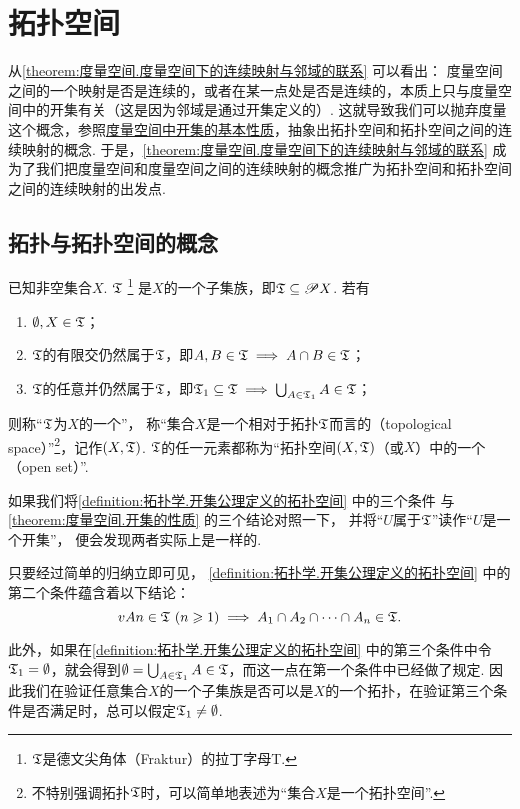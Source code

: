 \section{拓扑空间}
从\cref{theorem:度量空间.度量空间下的连续映射与邻域的联系} 可以看出：
度量空间之间的一个映射是否是连续的，或者在某一点处是否是连续的，本质上只与度量空间中的开集有关（这是因为邻域是通过开集定义的）.
这就导致我们可以抛弃度量这个概念，参照\hyperref[theorem:度量空间.开集的性质]{度量空间中开集的基本性质}，抽象出拓扑空间和拓扑空间之间的连续映射的概念.
于是，\cref{theorem:度量空间.度量空间下的连续映射与邻域的联系} 成为了我们把度量空间和度量空间之间的连续映射的概念推广为拓扑空间和拓扑空间之间的连续映射的出发点.

\subsection{拓扑与拓扑空间的概念}
\begin{definition}\label{definition:拓扑学.开集公理定义的拓扑空间}
已知非空集合\(X\).
\(\mathfrak T\)
\footnote{\(\mathfrak T\)是德文尖角体（Fraktur）的拉丁字母T.}
是\(X\)的一个子集族，即\(\mathfrak T \subseteq \mathscr{P} X\).
若有
\begin{enumerate}
\item \(\emptyset,X \in \mathfrak T\)；
\item \(\mathfrak T\)的有限交仍然属于\(\mathfrak T\)，即\(A,B \in \mathfrak T \implies A \cap B \in \mathfrak T\)；
\item \(\mathfrak T\)的任意并仍然属于\(\mathfrak T\)，即\(\mathfrak T_1 \subseteq \mathfrak T \implies \bigcup_{A \in \mathfrak T_1} A \in \mathfrak T\)；
\end{enumerate}
则称“\(\mathfrak T\)为\(X\)的一个”，%
称“集合\(X\)是一个相对于拓扑\(\mathfrak T\)而言的（topological space）”\footnote{%
不特别强调拓扑\(\mathfrak T\)时，可以简单地表述为“集合\(X\)是一个拓扑空间”.%
}，记作\((X,\mathfrak T)\).
\(\mathfrak T\)的任一元素都称为“拓扑空间\((X,\mathfrak T)\)（或\(X\)）中的一个（open set）”.
\end{definition}
如果我们将\cref{definition:拓扑学.开集公理定义的拓扑空间} 中的三个条件
与\cref{theorem:度量空间.开集的性质} 的三个结论对照一下，
并将“\(U\)属于\(\mathfrak T\)”读作“\(U\)是一个开集”，
便会发现两者实际上是一样的.

只要经过简单的归纳立即可见，
\cref{definition:拓扑学.开集公理定义的拓扑空间} 中的第二个条件蕴含着以下结论：\[
v{A}{n}\in\mathfrak T\ (n\geqslant1)
\implies
A_1 \cap A_2 \cap \dotsb \cap A_n \in \mathfrak T.
\]

此外，如果在\cref{definition:拓扑学.开集公理定义的拓扑空间} 中的第三个条件中令\(\mathfrak T_1=\emptyset\)，就会得到\(\emptyset = \bigcup_{A\in\mathfrak T_1} A \in \mathfrak T\)，而这一点在第一个条件中已经做了规定.
因此我们在验证任意集合\(X\)的一个子集族是否可以是\(X\)的一个拓扑，在验证第三个条件是否满足时，总可以假定\(\mathfrak T_1\neq\emptyset\).

